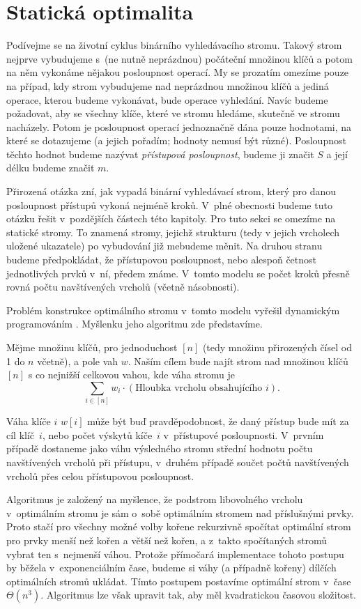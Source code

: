 \section{Statická optimalita}\label{sec:staticoptimality}

Podívejme se na životní cyklus binárního vyhledávacího stromu. Takový strom
nejprve vybudujeme s~(ne nutně neprázdnou) počáteční množinou klíčů
a potom na něm vykonáme nějakou posloupnost operací. My se prozatím omezíme
pouze na případ, kdy strom vybudujeme nad neprázdnou množinou klíčů a jediná
operace, kterou budeme vykonávat, bude operace vyhledání. Navíc budeme
požadovat, aby se všechny klíče, které ve stromu hledáme, skutečně ve stromu nacházely.
Potom je posloupnost operací jednoznačně dána pouze hodnotami, na které se
dotazujeme (a jejich pořadím; hodnoty nemusí být různé). Posloupnost těchto
hodnot budeme nazývat \emph{přístupová posloupnost}, budeme ji značit $S$ a
její délku budeme značit $m$.

Přirozená otázka zní, jak vypadá binární vyhledávací strom, který pro danou
posloupnost přístupů vykoná nejméně kroků. V~plné obecnosti budeme tuto otázku řešit v~pozdějších částech této kapitoly. Pro tuto sekci se omezíme na statické
stromy. To znamená stromy, jejichž strukturu (tedy v jejich vrcholech uložené
ukazatele) po vybudování již mebudeme měnit. Na druhou stranu budeme
předpokládat, že přístupovou posloupnost, nebo alespoň četnost jednotlivých
prvků v~ní, předem známe. V~tomto modelu se počet kroků přesně rovná počtu
navštívených vrcholů (včetně násobnosti).

Problém konstrukce optimálního stromu v~tomto modelu vyřešil dynamickým
programováním \citet{staticoptimality}. Myšlenku jeho algoritmu zde představíme.

Mějme množinu klíčů, pro jednoduchost $[n]$ (tedy
množinu přirozených čísel od 1 do $n$ včetně), a pole vah $w$. 
Naším cílem bude najít strom nad množinou klíčů $[n]$ s co nejnižší celkovou vahou, kde váha stromu je $$\sum_{i\in [n]}w_i\cdot (\text{Hloubka vrcholu obsahujícího $i$}).$$ 

Váha klíče
$i$ $w[i]$ může být buď pravděpodobnost, že daný přístup bude mít za
cíl klíč~$i$, nebo počet výskytů kíče~$i$ v~přístupové
posloupnosti. V~prvním případě dostaneme jako váhu výsledného stromu střední
hodnotu počtu navštívených vrcholů při přístupu, v~druhém případě součet počtů navštívených vrcholů přes
celou přístupovou posloupnost.

Algoritmus je založený na myšlence, že podstrom libovolného vrcholu
v~optimálním stromu je sám o~sobě optimálním stromem nad příslušnými prvky. Proto
stačí pro všechny možné volby kořene rekurzivně spočítat optimální strom pro
prvky menší než kořen a větší než kořen, a z~takto spočítaných stromů vybrat
ten s~nejmenší váhou. Protože přímočará implementace tohoto postupu by běžela
v~exponenciálním čase, budeme si váhy (a případně kořeny) dílčích optimálních
stromů ukládat. Tímto postupem postavíme optimální strom
v~čase $\Theta(n^3)$. Algoritmus lze však upravit tak, aby měl kvadratickou časovou složitost.



